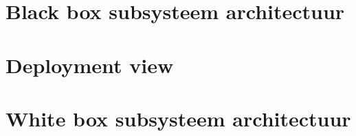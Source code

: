 \documentclass[12pt]{article} %
\begin{document}
\section{Black box subsysteem architectuur}
\label{sec:Black box subsysteem architectuur}

\newpage%
\section{Deployment view}
\label{sec:Deployment view}

\newpage%
\section{White box subsysteem architectuur}
\label{sec:conclusion}
\lipsum[0-2]
\newpage%
% 
% 
%
\end{document}
